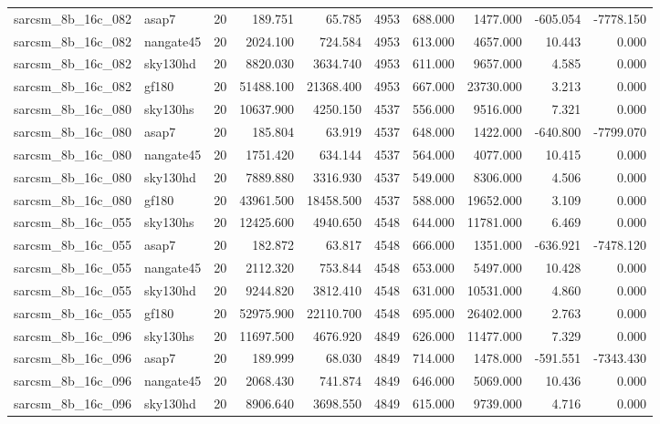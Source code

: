 \documentclass{article}
\begin{document}
\begin{longtable}{llrrrrrrrr}
sarcsm\_8b\_16c\_082 & asap7 & 20 & 189.751 & 65.785 & 4953 & 688.000 & 1477.000 & -605.054 & -7778.150 \\
sarcsm\_8b\_16c\_082 & nangate45 & 20 & 2024.100 & 724.584 & 4953 & 613.000 & 4657.000 & 10.443 & 0.000 \\
sarcsm\_8b\_16c\_082 & sky130hd & 20 & 8820.030 & 3634.740 & 4953 & 611.000 & 9657.000 & 4.585 & 0.000 \\
sarcsm\_8b\_16c\_082 & gf180 & 20 & 51488.100 & 21368.400 & 4953 & 667.000 & 23730.000 & 3.213 & 0.000 \\
sarcsm\_8b\_16c\_080 & sky130hs & 20 & 10637.900 & 4250.150 & 4537 & 556.000 & 9516.000 & 7.321 & 0.000 \\
sarcsm\_8b\_16c\_080 & asap7 & 20 & 185.804 & 63.919 & 4537 & 648.000 & 1422.000 & -640.800 & -7799.070 \\
sarcsm\_8b\_16c\_080 & nangate45 & 20 & 1751.420 & 634.144 & 4537 & 564.000 & 4077.000 & 10.415 & 0.000 \\
sarcsm\_8b\_16c\_080 & sky130hd & 20 & 7889.880 & 3316.930 & 4537 & 549.000 & 8306.000 & 4.506 & 0.000 \\
sarcsm\_8b\_16c\_080 & gf180 & 20 & 43961.500 & 18458.500 & 4537 & 588.000 & 19652.000 & 3.109 & 0.000 \\
sarcsm\_8b\_16c\_055 & sky130hs & 20 & 12425.600 & 4940.650 & 4548 & 644.000 & 11781.000 & 6.469 & 0.000 \\
sarcsm\_8b\_16c\_055 & asap7 & 20 & 182.872 & 63.817 & 4548 & 666.000 & 1351.000 & -636.921 & -7478.120 \\
sarcsm\_8b\_16c\_055 & nangate45 & 20 & 2112.320 & 753.844 & 4548 & 653.000 & 5497.000 & 10.428 & 0.000 \\
sarcsm\_8b\_16c\_055 & sky130hd & 20 & 9244.820 & 3812.410 & 4548 & 631.000 & 10531.000 & 4.860 & 0.000 \\
sarcsm\_8b\_16c\_055 & gf180 & 20 & 52975.900 & 22110.700 & 4548 & 695.000 & 26402.000 & 2.763 & 0.000 \\
sarcsm\_8b\_16c\_096 & sky130hs & 20 & 11697.500 & 4676.920 & 4849 & 626.000 & 11477.000 & 7.329 & 0.000 \\
sarcsm\_8b\_16c\_096 & asap7 & 20 & 189.999 & 68.030 & 4849 & 714.000 & 1478.000 & -591.551 & -7343.430 \\
sarcsm\_8b\_16c\_096 & nangate45 & 20 & 2068.430 & 741.874 & 4849 & 646.000 & 5069.000 & 10.436 & 0.000 \\
sarcsm\_8b\_16c\_096 & sky130hd & 20 & 8906.640 & 3698.550 & 4849 & 615.000 & 9739.000 & 4.716 & 0.000 \\

\end{longtable}
\end{document}

